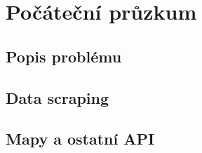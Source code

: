 \chapter{Počáteční průzkum}
\section{Popis problému}

\section{Data scraping}

\section{Mapy a ostatní API}

\endinput

